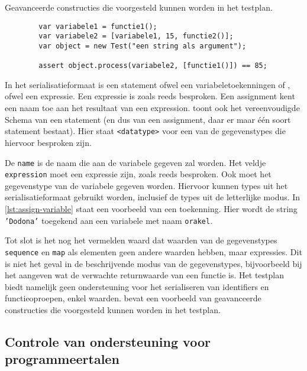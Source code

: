 \begin{listing}[h]
    \caption{Geavanceerde constructies die voorgesteld kunnen worden in het testplan.}
    \label{lst:advanced-expressions}
    \begin{verbatim}
        var variabele1 = functie1();
        var variabele2 = [variabele1, 15, functie2()];
        var object = new Test("een string als argument");

        assert object.process(variabele2, [functie1()]) == 85;
    \end{verbatim}
\end{listing}

In het serialisatieformaat is een statement ofwel een variabeletoekenningen of , ofwel een expressie.
Een expressie is zoals reeds besproken.
Een assignment kent een naam toe aan het resultaat van een expression.
 toont ook het vereenvoudigde  Schema van een statement (en dus van een assignment, daar er maar één soort statement bestaat).
Hier staat \texttt{<datatype>} voor een van de gegevenstypes die hiervoor besproken zijn.

De \texttt{name} is de naam die aan de variabele gegeven zal worden.
Het veldje \texttt{expression} moet een expressie zijn, zoals reeds besproken.
Ook moet het gegevenstype van de variabele gegeven worden.
Hiervoor kunnen types uit het serialisatieformaat gebruikt worden, inclusief de types uit de letterlijke modus.
In \cref{lst:assign-variable} staat een voorbeeld van een toekenning.
Hier wordt de string \texttt{'Dodona'} toegekend aan een variabele met naam \texttt{orakel}.

Tot slot is het nog het vermelden waard dat waarden van de gegevenstypes \texttt{sequence} en \texttt{map} als elementen geen andere waarden hebben, maar expressies.
Dit is niet het geval in de beschrijvende modus van de gegevenstypes, bijvoorbeeld bij het aangeven wat de verwachte returnwaarde van een functie is.
Het testplan biedt namelijk geen ondersteuning voor het serialiseren van identifiers en functieoproepen, enkel waarden.
 bevat een voorbeeld van geavanceerde constructies die voorgesteld kunnen worden in het testplan.

\subsection{Controle van ondersteuning voor programmeertalen}\label{subsec:vereiste-functies}

